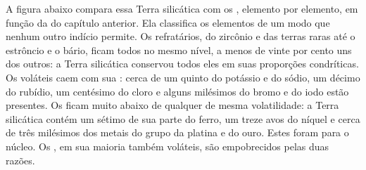 A figura abaixo compara essa Terra silicática com os , elemento por
elemento, em função da  do capítulo anterior. Ela classifica
os elementos de um modo que nenhum outro indício permite. Os 
refratários, do zircônio e das terras raras até o estrôncio e o bário, ficam todos
no mesmo nível, a menos de vinte por cento uns dos outros: a Terra silicática
conservou todos eles em suas proporções condríticas. Os  voláteis
caem com sua : cerca de um quinto do potássio
e do sódio, um décimo do rubídio, um centésimo do cloro e alguns
milésimos do bromo e do iodo estão presentes. Os  ficam muito abaixo de qualquer 
de mesma volatilidade: a Terra silicática contém um sétimo de sua parte do
ferro, um treze avos do níquel e cerca de três milésimos dos
metais do grupo da platina e do ouro. Estes foram para o núcleo. Os ,
em sua maioria também voláteis, são empobrecidos pelas duas razões.

